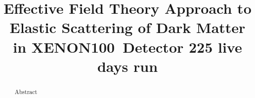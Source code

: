 \documentclass[twocolumn, showpacs, showkeys, amsmath, amssymb, floatfix]{revtex4}
\newcommand{\Xehund}{{XENON100}}
\begin{document}
\linenumbers 

\title{Effective Field Theory Approach to Elastic Scattering of Dark Matter in  \Xehund\ Detector 225 live days run}
%


\begin{abstract} 

Abstract
\end{abstract}

\pacs{}

\maketitle 














\end{document}
